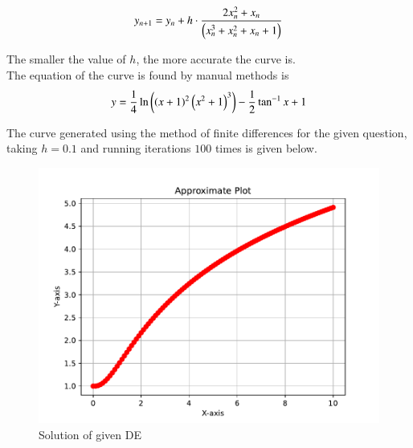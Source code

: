 \documentclass[journal]{IEEEtran}
\begin{document}
\begin{align}
y_{n+1} = y_n + h\cdot\frac{2x_n^2 + x_n}{\left(x_n^3 + x_n^2 + x_n + 1\right)}
\end{align}

The smaller the value of $h$, the more accurate the curve is. \\

The equation of the curve is found by manual methods is
\begin{align}
y = \frac{1}{4}\ln{\ensuremath{\left(\left(x+1\right)^2\left(x^2+1\right)^3\right)}} - \frac{1}{2}\tan^{-1}{x} + 1
\end{align}

The curve generated using the method of finite differences for the given question, taking $h=0.1$ and running iterations $100$ times is given below.

\begin{figure}[h]
	\centering
	\includegraphics[width=\columnwidth]{figs/fig.pdf}
	\caption{Solution of given DE}
	\label{fig}
\end{figure}
\end{document}
